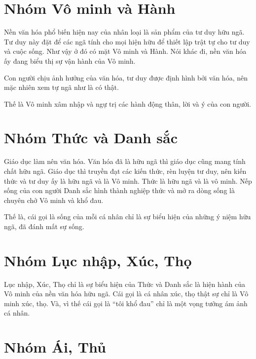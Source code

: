 \section{Nhóm Vô minh và Hành} %
\label{sec:vo_minh_va_hanh}

Nền văn hóa phổ biến hiện nay của nhân loại là sản phẩm của tư duy hữu ngã. Tư duy này đặt để các ngã tính cho mọi hiện hữu để thiết lập trật tự cho tư duy và cuộc sống. Như vậy ở đó có mặt Vô minh và Hành. Nói khác đi, nền văn hóa ấy đang biểu thị sự vận hành của Vô minh.

Con người chịu ảnh hưởng của văn hóa, tư duy được định hình bởi văn hóa, nên mặc nhiên xem tự ngã như là có thật.

Thế là Vô minh xâm nhập và ngự trị các hành động thân, lời và ý của con người.


\section{Nhóm Thức và Danh sắc} %
\label{sec:thuc_va_danh_sac}

Giáo dục làm nên văn hóa. Văn hóa đã là hữu ngã thì giáo dục cũng mang tính chất hữu ngã. Giáo dục thì truyền đạt các kiến thức, rèn luyện tư duy, nên kiến thức và tư duy ấy là hữu ngã và là Vô minh. Thức là hữu ngã và là vô minh. Nếp sống của con người Danh sắc hình thành nghiệp thức và mở ra dòng sống là chuyên chở Vô minh và khổ đau.

Thế là, cái gọi là sống của mỗi cá nhân chỉ là sự biểu hiện của những ý niệm hữu ngã, đã đánh mất sự sống.


\section{Nhóm Lục nhập, Xúc, Thọ} %
\label{sec:luc_nhap_xuc_tho}

Lục nhập, Xúc, Thọ chỉ là sự biểu hiện của Thức và Danh sắc là hiện hành của Vô minh của nền văn hóa hữu ngã. Cái gọi là cá nhân xúc, thọ thật sự chỉ là Vô minh xúc, thọ. Và, vì thế cái gọi là ``tôi khổ đau'' chỉ là một vọng tưởng ám ảnh cá nhân.


\section{Nhóm Ái, Thủ} %
\label{sec:ai_thu}

